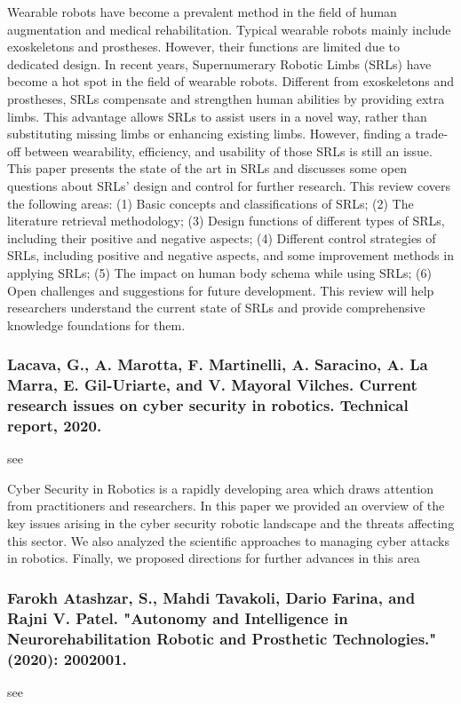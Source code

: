 \documentclass[conference]{IEEEtran}
\begin{document}
Wearable robots have become a prevalent method in the field of human augmentation and medical rehabilitation. Typical wearable robots mainly include exoskeletons and prostheses. However, their functions are limited due to dedicated design. In recent years, Supernumerary Robotic Limbs (SRLs) have become a hot spot in the field of wearable robots. Different from exoskeletons and prostheses, SRLs compensate and strengthen human abilities by providing extra limbs. This advantage allows SRLs to assist users in a novel way, rather than substituting missing limbs or enhancing existing limbs. However, finding a trade-off between wearability, efficiency, and usability of those SRLs is still an issue. This paper presents the state of the art in SRLs and discusses some open questions about SRLs’ design and control for further research. This review covers the following areas: (1) Basic concepts and classifications of SRLs; (2) The literature retrieval methodology; (3) Design functions of different types of SRLs, including their positive and negative aspects; (4) Different control strategies of SRLs, including positive and negative aspects, and some improvement methods in applying SRLs; (5) The impact on human body schema while using SRLs; (6) Open challenges and suggestions for future development. This review will help researchers understand the current state of SRLs and provide comprehensive knowledge foundations for them.

\medskip
\subsubsection{Lacava, G., A. Marotta, F. Martinelli, A. Saracino, A. La Marra, E. Gil-Uriarte, and V. Mayoral Vilches. Current research issues on cyber security in robotics. Technical report, 2020.}
see \cite{lacava2020current}

Cyber Security in Robotics is a rapidly developing area which draws attention from
practitioners and researchers. In this paper we provided an overview of the key issues
arising in the cyber security robotic landscape and the threats affecting this sector. We
also analyzed the scientific approaches to managing cyber attacks in robotics. Finally, we
proposed directions for further advances in this area

\medskip
\subsubsection{Farokh Atashzar, S., Mahdi Tavakoli, Dario Farina, and Rajni V. Patel. "Autonomy and Intelligence in Neurorehabilitation Robotic and Prosthetic Technologies." (2020): 2002001.}
see \cite{farokh2020autonomy}
\end{document}
